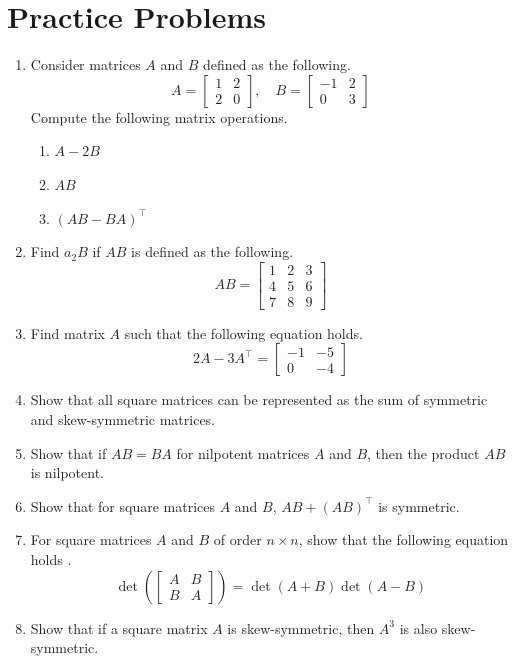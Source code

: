 \documentclass[../main.tex]{subfiles}
\begin{document}
\section{Practice Problems}
\begin{enumerate}
\item
Consider matrices $A$ and $B$ defined as the following.
\[
A =
\begin{bmatrix}
    1 & 2 \\
    2 & 0
\end{bmatrix},
\quad
B =
\begin{bmatrix}
    -1 & 2 \\
    0  & 3
\end{bmatrix}
\]
Compute the following matrix operations.
\begin{enumerate}[noitemsep]
\item $A - 2B$
\item $AB$
\item $(AB - BA)^\intercal$
\end{enumerate}

\item
Find $a_2B$ if $AB$ is defined as the following.
\[
AB =
\begin{bmatrix}
    1 & 2 & 3 \\
    4 & 5 & 6 \\
    7 & 8 & 9
\end{bmatrix}
\]

\item
Find matrix $A$ such that the following equation holds.
\[
2A - 3A^\intercal =
\begin{bmatrix}
    -1 & -5 \\
    0  & -4
\end{bmatrix}
\]

\item
Show that all square matrices can be represented as the sum of
symmetric and skew-symmetric matrices.

\item
Show that if $AB = BA$ for nilpotent matrices $A$ and $B$, then the
product $AB$ is nilpotent.

\item
Show that for square matrices $A$ and $B$, $AB + (AB)^\intercal$
is symmetric.

\item
For square matrices $A$ and $B$ of order $n \times n$, show that
the following equation holds \cite{refbook1}.
\[
\det\left(
    \begin{bmatrix}
        A & B \\
        B & A
    \end{bmatrix}
\right)
= \det(A + B) \det(A - B)
\]

\item
Show that if a square matrix $A$ is skew-symmetric, then $A^3$ is
also skew-symmetric.
\end{enumerate}
\end{document}
